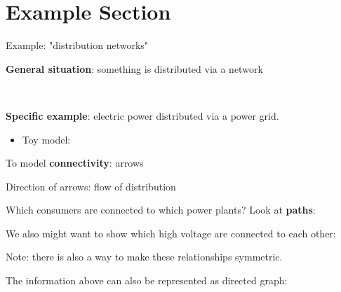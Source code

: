 \section{Example Section }

\begin{frame}[fragile]{Example: "distribution networks"}

\textbf{General situation}: something is distributed via a network

\

\textbf{Specific example}: electric power distributed via a power grid. 

\begin{itemize}
\item Toy model: 
\end{itemize}

\vfill
\vfill
\vfill
\vfill
\vfill
\vfill


\end{frame}

\begin{frame}[fragile]{}


To model \textbf{connectivity}: arrows

Direction of arrows: flow of distribution

\vfill \vfill \vfill \vfill \vfill \vfill \vfill \vfill \vfill 

\end{frame}

\begin{frame}[fragile]{}

Which consumers are connected to which power plants? Look at \textbf{paths}:


\vfill \vfill \vfill \vfill \vfill \vfill \vfill \vfill \vfill 
\end{frame}


\begin{frame}[fragile]{}

We also might want to show which high voltage are connected to each other:

\vfill \vfill \vfill \vfill \vfill \vfill \vfill \vfill \vfill 

Note: there is also a way to make these relationships symmetric.

\end{frame}


\begin{frame}[fragile]{}

The information above can also be represented as directed graph:

\vfill \vfill \vfill \vfill \vfill \vfill \vfill \vfill \vfill 

\end{frame}


